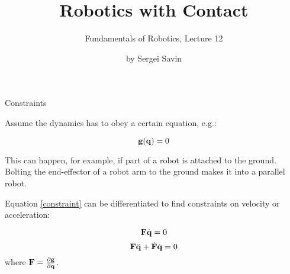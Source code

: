 \documentclass{beamer}
\title{Robotics with Contact}
\subtitle{Fundamentals of Robotics, Lecture 12}
\author{by Sergei Savin}
\date{\mydate}
\begin{document}
\maketitle





\begin{frame}{Constraints}
	\begin{flushleft}
		
		Assume the dynamics has to obey a certain equation, e.g.:
		
		\begin{equation}
			\label{constraint}
			\mathbf{g} (\mathbf{q}) = 0
		\end{equation}
		
		This can happen, for example, if part of a robot is attached to the ground. Bolting the end-effector of a robot arm to the ground makes it into a parallel robot.
		
		\bigskip
		
		Equation \eqref{constraint} can be differentiated to find constraints on velocity or acceleration:
		
		\begin{equation}
			\mathbf{F} \dot{\mathbf{q}} = 0
		\end{equation}		
		\begin{equation}
			\mathbf{F}\ddot{\mathbf{q}} + \dot{\mathbf{F}} \dot{\mathbf{q}} = 0
		\end{equation}		
		where $\mathbf{F} = \frac{\partial \mathbf{g}}{\partial \mathbf{q}}$.
		
	\end{flushleft}
\end{frame}
\end{document}
